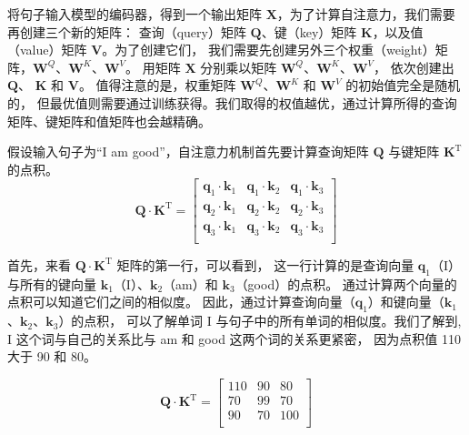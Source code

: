 将句子输入模型的编码器，得到一个输出矩阵 $\mathbf{X}$，为了计算自注意力，我们需要再创建三个新的矩阵：
查询（query）矩阵 $\mathbf{Q}$、键（key）矩阵 $\mathbf{K}$，以及值（value）矩阵 $\mathbf{V}$。为了创建它们，
我们需要先创建另外三个权重（weight）矩阵，$\mathbf{W}^Q$、$\mathbf{W}^K$、$\mathbf{W}^V$。
用矩阵 $\mathbf{X}$ 分别乘以矩阵 $\mathbf{W}^Q$、$\mathbf{W}^K$、$\mathbf{W}^V$，
依次创建出 $\mathbf{Q}$、 $\mathbf{K}$ 和 $\mathbf{V}$。
值得注意的是，权重矩阵 $\mathbf{W}^Q$、$\mathbf{W}^K$ 和 $\mathbf{W}^V$ 的初始值完全是随机的，
但最优值则需要通过训练获得。我们取得的权值越优，通过计算所得的查询矩阵、键矩阵和值矩阵也会越精确。

假设输入句子为“I am good”，自注意力机制首先要计算查询矩阵 $\boldsymbol{Q}$ 与键矩阵 $\boldsymbol{K}^\mathrm{T}$ 的点积。
$$
	\boldsymbol{Q} \cdot \boldsymbol{K}^\mathrm{T} =
	\begin{bmatrix}
		\boldsymbol{q}_1 \cdot \boldsymbol{k}_1 & \boldsymbol{q}_1 \cdot \boldsymbol{k}_2 & \boldsymbol{q}_1 \cdot \boldsymbol{k}_3 \\
		\boldsymbol{q}_2 \cdot \boldsymbol{k}_1 & \boldsymbol{q}_2 \cdot \boldsymbol{k}_2 & \boldsymbol{q}_2 \cdot \boldsymbol{k}_3 \\
		\boldsymbol{q}_3 \cdot \boldsymbol{k}_1 & \boldsymbol{q}_3 \cdot \boldsymbol{k}_2 & \boldsymbol{q}_3 \cdot \boldsymbol{k}_3 \\
	\end{bmatrix}
$$

首先，来看 $\boldsymbol{Q} \cdot \boldsymbol{K}^\mathrm{T}$ 矩阵的第一行，可以看到，
这一行计算的是查询向量 $\boldsymbol{q}_1$（I）与所有的键向量 $\boldsymbol{k}_1$（I）、$\boldsymbol{k}_2$（am）和 $\boldsymbol{k}_3$（good）的点积。
通过计算两个向量的点积可以知道它们之间的相似度。
因此，通过计算查询向量（$\boldsymbol{q}_1$）和键向量（$\boldsymbol{k}_1$、$\boldsymbol{k}_2$、$\boldsymbol{k}_3$）的点积，
可以了解单词 I 与句子中的所有单词的相似度。我们了解到, I 这个词与自己的关系比与 am 和 good 这两个词的关系更紧密，
因为点积值 110 大于 90 和 80。

\begin{table}[h]
	\centering
	$$
		\boldsymbol{Q} \cdot \boldsymbol{K}^\mathrm{T} =
		\begin{bmatrix}
			110 & 90 & 80  \\
			70  & 99 & 70  \\
			90  & 70 & 100 \\
		\end{bmatrix}
	$$
	\caption{点积示例，本节的结果均为假设值，后续不再说明}
\end{table}

